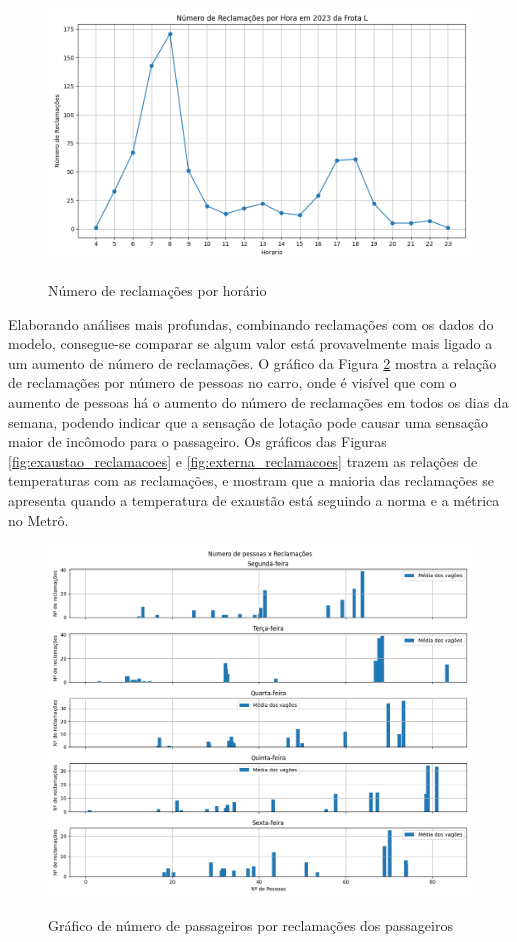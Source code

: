 \documentclass[acronym,symbols,table]{fei}
\begin{document}
\begin{figure}[!htb]
    \centering
    \caption{Número de reclamações por horário}
    \includegraphics[width=0.7\linewidth]{Imagens/reclamacao_hora.png}
    \label{fig:reclamacao_hora}
\end{figure}

\newpage
Elaborando análises mais profundas, combinando reclamações com os dados do modelo, consegue-se comparar se algum valor está provavelmente mais ligado a um aumento de número de reclamações. O gráfico da Figura \ref{fig:numero_reclamacoes} mostra a relação de reclamações por número de pessoas no carro, onde é visível que com o aumento de pessoas há o aumento do número de reclamações em todos os dias da semana, podendo indicar que a sensação de lotação pode causar uma sensação maior de incômodo para o passageiro. Os gráficos das Figuras \ref{fig:exaustao_reclamacoes} e \ref{fig:externa_reclamacoes} trazem as relações de temperaturas com as reclamações, e mostram que a maioria das reclamações se apresenta quando a temperatura de exaustão está seguindo a norma e a métrica no Metrô.

\begin{figure}[!htb]
    \centering
    \caption{Gráfico de número de passageiros por reclamações dos passageiros}
    \includegraphics[width=0.7\linewidth]{Imagens/Numero_de_pessoas_x_Reclamacoes.png}
    \label{fig:numero_reclamacoes}
\end{figure}
\end{document}
